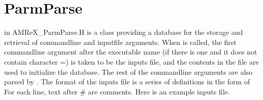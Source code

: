 \documentclass[letterpaper,10pt,english]{sphinxmanual}
\begin{document}
\section{ParmParse}
\label{\detokenize{Basics:parmparse}}\label{\detokenize{Basics:sec-basics-parmparse}}
\sphinxAtStartPar
{} in AMReX\_ParmParse.H is a class providing a database for the
storage and retrieval of command\sphinxhyphen{}line and input\sphinxhyphen{}file arguments. When
 is called, the first command\sphinxhyphen{}line argument after the
executable name (if there is one and it does not contain character =) is taken
to be the inputs file, and the contents in the file are used to initialize the
 database. The rest of the command\sphinxhyphen{}line arguments are also
parsed by . The format of the inputs file is a series of
definitions in the form of  For each line,
text after \# are comments. Here is an example inputs file.
\begin{quote}

\begin{sphinxVerbatim}[commandchars=\\\{\}]
                    
                   
                       
                
                
        
                 
\end{sphinxVerbatim}
\end{quote}
\end{document}
